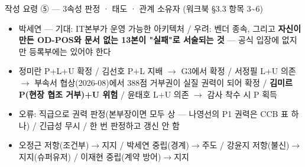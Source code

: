 \begin{frame}[allowframebreaks=1.0]{작성 요령 ⑤ — 3속성 판정 · 태도 · 관계 소유자 (워크북 §3.3 항목 3\textasciitilde{}6)}
\small
\par\smallskip{}\nobreak
\begin{itemize}
\item\relax 박세연 — 기대: IT본부가 운영 가능한 아키텍처 / 우려: 벤더 종속, 그리고 \textbf{자신이 만든 OD-POS와 문서 없는 13본이 "실패"로 서술되는 것} — 공식 입장에 없지만 등록부에는 있어야 한다
\end{itemize}
\par\smallskip{}\nobreak
\begin{itemize}
\item\relax 정미란 P+L+U 확정 / 김선호 P+L 지배 $\rightarrow$ G3에서 확정 / 서정필 L+U 의존 $\rightarrow$ 부속서 협상(2026-08)에서 388점 거부권이 실질 권력이 되어 확정 / \textbf{김미르 P(현장 협조 거부)+U 위험} / 윤태호 L+U 의존 $\rightarrow$ 감사 착수 시 P 획득
\item\relax 오류: 직급으로 권력 판정(본부장이면 모두 상 — 나영선의 P1 권력은 CCB 표 하나) / 긴급성 무시 / 한 번 판정하고 갱신 안 함
\end{itemize}
\par\smallskip{}\nobreak
\begin{itemize}
\item\relax 오정근 저항(조건부)$\rightarrow$지지 / 박세연 중립(경계)$\rightarrow$주도 / 강윤지 저항(불신)$\rightarrow$지지(슈퍼유저) / 이재현 중립(계약 방어)$\rightarrow$지지
\end{itemize}
\par\smallskip{}\nobreak

\end{frame}
